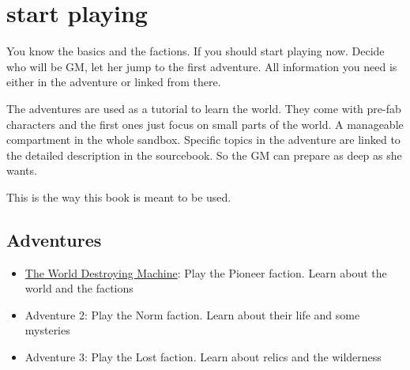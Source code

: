 \section{start playing}

You know the basics and the factions. If you should start playing now. Decide who will be GM, let her jump to the first adventure.
All information you need is either in the adventure or linked from there.

The adventures are used as a tutorial to learn the world. They come with pre-fab characters and the first ones just focus on small parts of the world. A manageable compartment in the whole sandbox.
Specific topics in the adventure are linked to the detailed description in the sourcebook. So the GM can prepare as deep as she wants.

This is the way this book is meant to be used.

\subsection{Adventures}

\begin{itemize}
\item \hyperref[ch:the world destroying machine]{The World Destroying Machine}: Play the Pioneer faction. Learn about the world and the factions
\item Adventure 2: Play the Norm faction. Learn about their life and some mysteries
\item Adventure 3: Play the Lost faction. Learn about relics and the wilderness
\end{itemize}